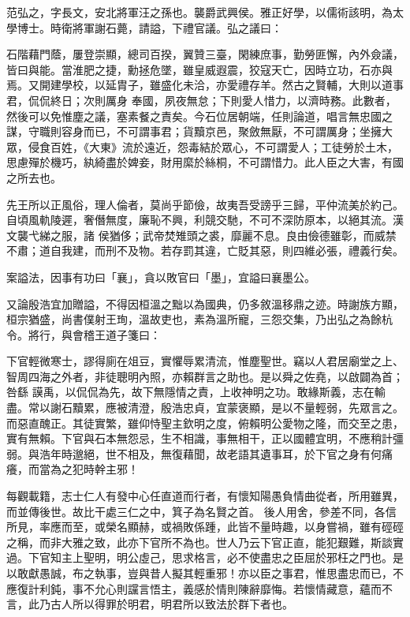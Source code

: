 \begin{pinyinscope}
 范弘之，字長文，安北將軍汪之孫也。襲爵武興侯。雅正好學，以儒術該明，為太學博士。時衛將軍謝石薨，請謚，下禮官議。弘之議曰：



 石階藉門蔭，屢登崇顯，總司百揆，翼贊三臺，閑練庶事，勤勞匪懈，內外僉議，皆曰與能。當淮肥之捷，勳拯危墜，雖皇威遐震，狡寇天亡，因時立功，石亦與焉。又開建學校，以延胄子，雖盛化未洽，亦愛禮存羊。然古之賢輔，大則以道事君，侃侃終日；次則厲身
 奉國，夙夜無怠；下則愛人惜力，以濟時務。此數者，然後可以免惟塵之議，塞素餐之責矣。今石位居朝端，任則論道，唱言無忠國之謀，守職則容身而已，不可謂事君；貨黷京邑，聚斂無厭，不可謂厲身；坐擁大眾，侵食百姓，《大東》流於遠近，怨毒結於眾心，不可謂愛人；工徒勞於土木，思慮殫於機巧，紈綺盡於婢妾，財用縻於絲桐，不可謂惜力。此人臣之大害，有國之所去也。



 先王所以正風俗，理人倫者，莫尚乎節儉，故夷吾受謗乎三歸，平仲流美於約己。自頃風軌陵遲，奢僭無度，廉恥不興，利競交馳，不可不深防原本，以絕其流。漢文襲弋綈之服，諸
 侯猶侈；武帝焚雉頭之裘，靡麗不息。良由儉德雖彰，而威禁不肅；道自我建，而刑不及物。若存罰其違，亡貶其惡，則四維必張，禮義行矣。



 案謚法，因事有功曰「襄」，貪以敗官曰「墨」，宜謚曰襄墨公。



 又論殷浩宜加贈謚，不得因桓溫之黜以為國典，仍多敘溫移鼎之迹。時謝族方顯，桓宗猶盛，尚書僕射王珣，溫故吏也，素為溫所寵，三怨交集，乃出弘之為餘杭令。將行，與會稽王道子箋曰：



 下官輕微寒士，謬得廁在俎豆，實懼辱累清流，惟塵聖世。竊以人君居廟堂之上、智周四海之外者，非徒聰明內照，亦賴群言之助也。是以舜之佐堯，以啟闢為首；咎繇
 謨禹，以侃侃為先，故下無隱情之責，上收神明之功。敢緣斯義，志在輸盡。常以謝石黷累，應被清澄，殷浩忠貞，宜蒙褒顯，是以不量輕弱，先眾言之。而惡直醜正。其徒實繁，雖仰恃聖主欽明之度，俯賴明公愛物之隆，而交至之患，實有無賴。下官與石本無怨忌，生不相識，事無相干，正以國體宜明，不應稍計彊弱。與浩年時邈絕，世不相及，無復藉聞，故老語其遺事耳，於下官之身有何痛癢，而當為之犯時幹主邪！



 每觀載籍，志士仁人有發中心任直道而行者，有懷知陽愚負情曲從者，所用雖異，而並傳後世。故比干處三仁之中，箕子為名賢之首。
 後人用舍，參差不同，各信所見，率應而至，或榮名顯赫，或禍敗係踵，此皆不量時趣，以身嘗禍，雖有硜硜之稱，而非大雅之致，此亦下官所不為也。世人乃云下官正直，能犯艱難，斯談實過。下官知主上聖明，明公虛己，思求格言，必不使盡忠之臣屈於邪枉之門也。是以敢獻愚誠，布之執事，豈與昔人擬其輕重邪！亦以臣之事君，惟思盡忠而已，不應復計利鈍，事不允心則讜言悟主，義感於情則陳辭靡悔。若懷情藏意，蘊而不言，此乃古人所以得罪於明君，明君所以致法於群下者也。




\end{pinyinscope}
